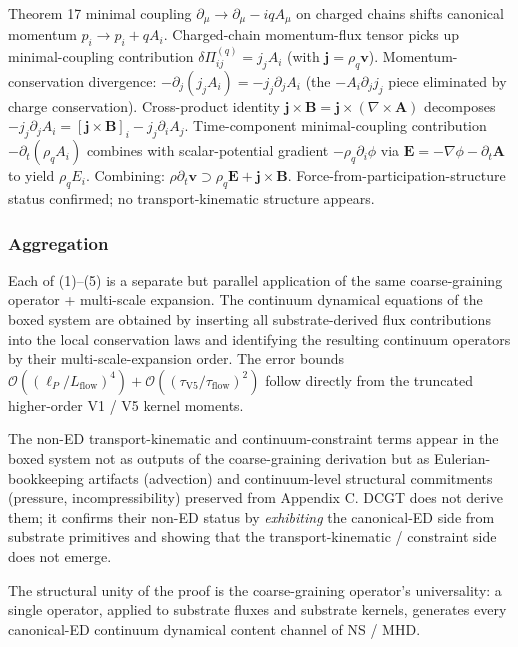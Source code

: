 \documentclass[
]{article}
\begin{document}
Theorem 17 minimal coupling \(\partial_\mu \to \partial_\mu - iqA_\mu\)
on charged chains shifts canonical momentum \(p_i \to p_i + qA_i\).
Charged-chain momentum-flux tensor picks up minimal-coupling
contribution \(\delta\Pi^{(q)}_{ij} = j_j A_i\) (with
\(\mathbf{j} = \rho_q\mathbf{v}\)). Momentum-conservation divergence:
\(-\partial_j(j_jA_i) = -j_j\partial_jA_i\) (the \(-A_i\partial_j j_j\)
piece eliminated by charge conservation). Cross-product identity
\(\mathbf{j}\times\mathbf{B} = \mathbf{j}\times(\nabla\times\mathbf{A})\)
decomposes
\(-j_j\partial_jA_i = [\mathbf{j}\times\mathbf{B}]_i - j_j\partial_iA_j\).
Time-component minimal-coupling contribution \(-\partial_t(\rho_qA_i)\)
combines with scalar-potential gradient \(-\rho_q\partial_i\phi\) via
\(\mathbf{E} = -\nabla\phi - \partial_t\mathbf{A}\) to yield
\(\rho_qE_i\). Combining:
\(\rho\partial_t\mathbf{v} \supset \rho_q\mathbf{E} + \mathbf{j}\times\mathbf{B}\).
Force-from-participation-structure status confirmed; no
transport-kinematic structure appears.

\subsubsection{Aggregation}\label{aggregation}

Each of (1)--(5) is a separate but parallel application of the same
coarse-graining operator + multi-scale expansion. The continuum
dynamical equations of the boxed system are obtained by inserting all
substrate-derived flux contributions into the local conservation laws
and identifying the resulting continuum operators by their
multi-scale-expansion order. The error bounds
\(\mathcal{O}((\ell_P/L_\mathrm{flow})^4) + \mathcal{O}((\tau_\mathrm{V5}/\tau_\mathrm{flow})^2)\)
follow directly from the truncated higher-order V1 / V5 kernel moments.

The non-ED transport-kinematic and continuum-constraint terms appear in
the boxed system not as outputs of the coarse-graining derivation but as
Eulerian-bookkeeping artifacts (advection) and continuum-level
structural commitments (pressure, incompressibility) preserved from
Appendix C. DCGT does not derive them; it confirms their non-ED status
by \emph{exhibiting} the canonical-ED side from substrate primitives and
showing that the transport-kinematic / constraint side does not emerge.

The structural unity of the proof is the coarse-graining operator's
universality: a single operator, applied to substrate fluxes and
substrate kernels, generates every canonical-ED continuum dynamical
content channel of NS / MHD.
\end{document}

